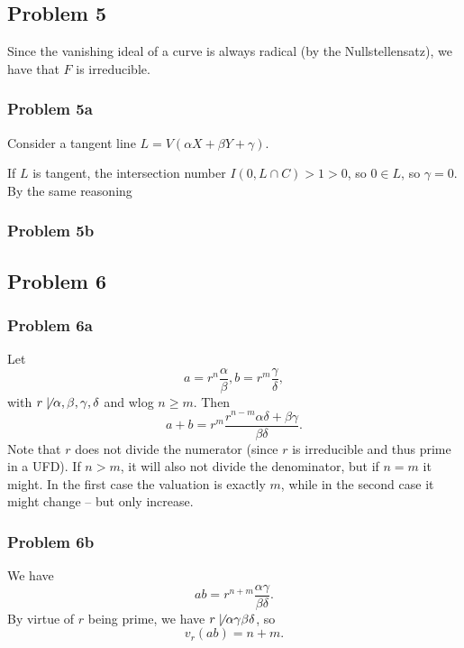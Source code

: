 \subsection*{Problem 5}

Since the vanishing ideal of a curve is always radical (by the Nullstellensatz),
we have that \( F\) is irreducible.

\subsubsection*{Problem 5a}

Consider a tangent line 
\( L = V(\alpha X + \beta Y + \gamma )\).

If \( L \) is tangent, the intersection number \( I(0, L \cap C)  > 1 > 0 \),
so \( 0 \in L \), so \( \gamma = 0 \). By the same reasoning

\subsubsection*{Problem 5b}

\subsection*{Problem 6}

\subsubsection*{Problem 6a}

Let
\[ 
    a = r^n \frac{\alpha}{\beta}, b = r^m \frac{\gamma}{\delta},
\]
with \( r \not\mid \alpha, \beta, \gamma, \delta \) and wlog \( n \geqslant m \). Then
\[ 
    a + b = r^m \frac{r^{n-m}\alpha\delta + \beta\gamma}{\beta\delta}.
\]
Note that \( r \) does not divide the numerator (since \( r \) is irreducible
and thus prime in a UFD). If \( n > m \), it will also not divide the denominator,
but if \( n = m \) it might. In the first case the valuation is exactly \( m \),
while in the second case it might change -- but only increase.

\subsubsection*{Problem 6b}

We have
\[ 
    ab = r^{n+m} \frac{\alpha\gamma}{\beta\delta}. 
\]
By virtue of \( r\) being prime, we have \( r \not\mid \alpha\gamma\beta\delta \),
so
\[ 
    v_r(ab) = n + m. 
\]

